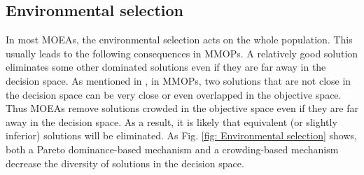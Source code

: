 \documentclass[conference]{IEEEtran}
\begin{document}
\subsection{Environmental selection}
\label{Impact of environmental selection}
In most MOEAs, the environmental selection acts on the whole population. This usually leads to the following consequences in MMOPs.
A relatively good solution eliminates some other dominated solutions even if they are far away in the decision space. As mentioned in \cite{liang2016multimodal}, in MMOPs, two solutions that are not close in the decision space can be very close or even overlapped in the objective space. Thus MOEAs remove solutions crowded in the objective space even if they are far away in the decision space. As a result, it is likely that equivalent (or slightly inferior) solutions will be eliminated. As Fig. \ref{fig: Environmental selection} shows, both a Pareto dominance-based mechanism and a crowding-based mechanism decrease the diversity of solutions in the decision space. 
\end{document}
